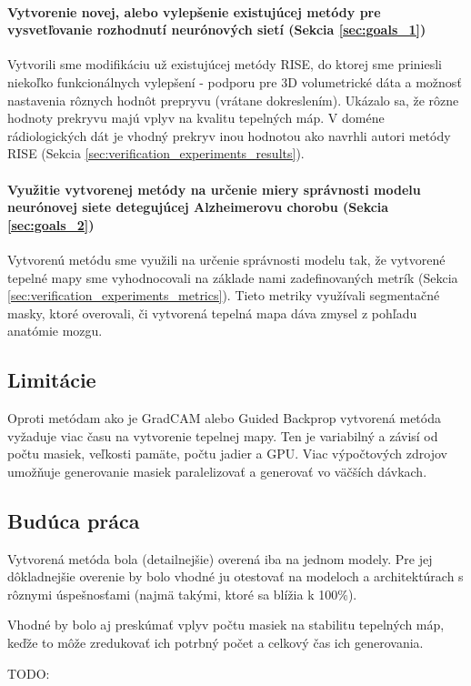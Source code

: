 \paragraph{Vytvorenie novej, alebo vylepšenie existujúcej metódy pre vysvetľovanie rozhodnutí neurónových sietí (Sekcia \ref{sec:goals_1})}

Vytvorili sme modifikáciu už existujúcej metódy RISE, do ktorej sme priniesli niekoľko funkcionálnych vylepšení - podporu pre 3D volumetrické dáta a možnosť nastavenia rôznych hodnôt prepryvu (vrátane dokreslením). Ukázalo sa, že rôzne hodnoty prekryvu majú vplyv na kvalitu tepelných máp. V doméne rádiologických dát je vhodný prekryv inou hodnotou ako navrhli autori metódy RISE (Sekcia \ref{sec:verification_experiments_results}).

\paragraph{Využitie vytvorenej metódy na určenie miery správnosti modelu neurónovej siete detegujúcej Alzheimerovu chorobu (Sekcia \ref{sec:goals_2})}

Vytvorenú metódu sme využili na určenie správnosti modelu tak, že vytvorené tepelné mapy sme vyhodnocovali na základe nami zadefinovaných metrík (Sekcia \ref{sec:verification_experiments_metrics}). Tieto metriky využívali segmentačné masky, ktoré overovali, či vytvorená tepelná mapa dáva zmysel z pohľadu anatómie mozgu.

\subsection{Limitácie}

Oproti metódam ako je GradCAM alebo Guided Backprop vytvorená metóda vyžaduje viac času na vytvorenie tepelnej mapy. Ten je variabilný a závisí od počtu masiek, veľkosti pamäte, počtu jadier a GPU. Viac výpočtových zdrojov umožňuje generovanie masiek paralelizovať a generovať vo väčších dávkach.

\subsection{Budúca práca}

Vytvorená metóda bola (detailnejšie) overená iba na jednom modely. Pre jej dôkladnejšie overenie by bolo vhodné ju otestovať na modeloch a architektúrach s rôznymi úspešnosťami (najmä takými, ktoré sa blížia k 100\%).

Vhodné by bolo aj preskúmať vplyv počtu masiek na stabilitu tepelných máp, keďže to môže zredukovať ich potrbný počet a celkový čas ich generovania. 

TODO: